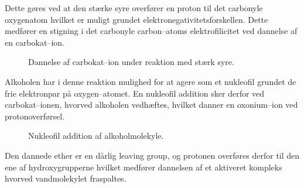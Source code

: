     Dette gøres ved at den stærke syre overfører en proton til det carbonyle oxygenatom hvilket er muligt grundet elektronegativitetsforskellen. Dette medfører en stigning i det carbonyle carbon--atoms elektrofilicitet ved dannelse af en carbokat--ion. \vskip 8pt
    \begin{figure}[H]
        \caption{Dannelse af carbokat--ion under reaktion med stærk syre.}
    \end{figure}
    Alkoholen har i denne reaktion mulighed for at agere som et nukleofil grundet de frie elektronpar på oxygen--atomet. En nukleofil addition sker derfor ved carbokat--ionen, hvorved alkoholen vedhæftes, hvilket danner en oxonium--ion ved protonoverførsel.
    \begin{figure}[H]
        \caption{Nukleofil addition af alkoholmolekyle.}
    \end{figure}
    Den dannede ether er en dårlig leaving group, og protonen overføres derfor til den ene af hydroxygrupperne hvilket medfører dannelsen af et aktiveret kompleks hvorved vandmolekylet fraspaltes. 
